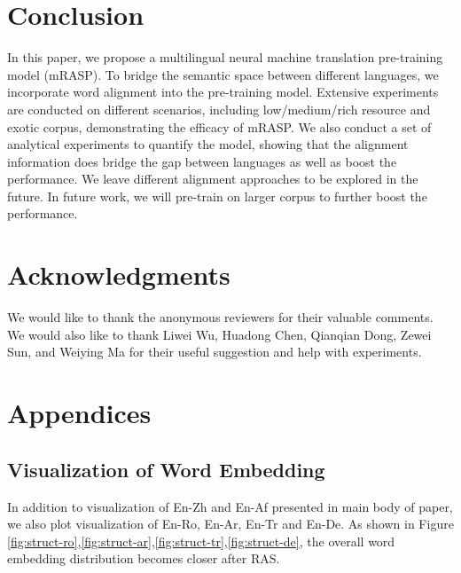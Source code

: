 \documentclass[11pt,a4paper]{article}
\newcommand{\method}{mRASP\xspace}
\begin{document}
\section{Conclusion}
\label{sec:conclusion}
In this paper, we propose a multilingual neural machine translation pre-training model (\method). To bridge the semantic space between different languages, we incorporate word alignment into the pre-training model. Extensive experiments are conducted on different scenarios, including low/medium/rich resource and exotic corpus, demonstrating the efficacy of \method. We also conduct a set of analytical experiments to quantify the model, showing that the alignment information does bridge the gap between languages as well as boost the performance. We leave different alignment approaches to be explored in the future. In future work, we will pre-train on larger corpus to further boost the performance. 
\section*{Acknowledgments}
We would like to thank the anonymous reviewers for their valuable comments.
We would also like to thank Liwei Wu, Huadong Chen, Qianqian Dong, Zewei Sun, and Weiying Ma for their useful suggestion and help with experiments.





\newpage

\appendix
\section{Appendices}
\label{sec:appendix}














\subsection{Visualization of Word Embedding}

In addition to visualization of En-Zh and En-Af presented in main body of paper, we also plot visualization of En-Ro, En-Ar, En-Tr and En-De. As shown in Figure \ref{fig:struct-ro},\ref{fig:struct-ar},\ref{fig:struct-tr},\ref{fig:struct-de}, the overall word embedding distribution becomes closer after RAS.
\end{document}
